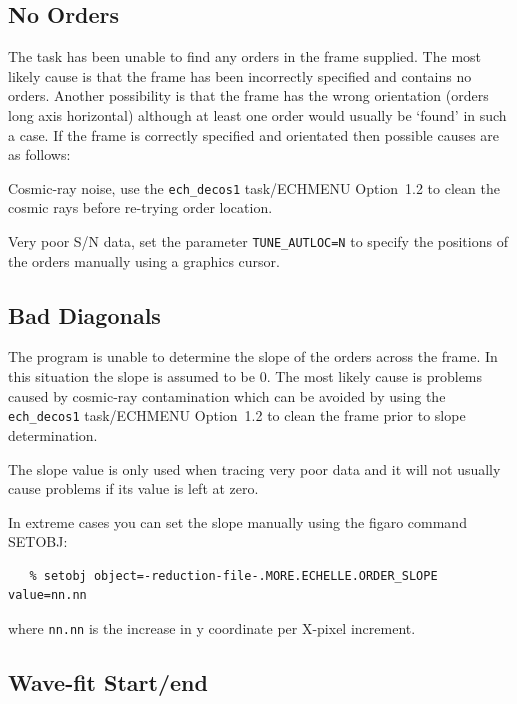 \documentclass[11pt,twoside]{article}
\newcommand{\htmlref}[2]{#1}
\newcommand{\xref}[3]{#1}
\newcommand{\xlabel}[1]{}
\newcommand{\mlabel}[1]{\xlabel{#1}\label{#1}}
\newcommand{\myindex}[1]{\index{#1}}
\renewcommand{\myindex}[1]{}
\begin{document}
\subsection{\mlabel{no_orders} No Orders}
\myindex{Locating orders!failure}

The task has been unable to find any orders in the frame supplied. The
most likely cause is that the frame has been incorrectly specified and
contains no orders. Another possibility is that the frame has the wrong
orientation (orders long axis horizontal) although at least one order
would usually be `found' in such a case. If the frame is correctly
specified and orientated then possible causes are as follows:

Cosmic-ray noise, use the \htmlref{{\tt ech\_decos1} task/ECHMENU Option~1.2}
{ech_decos1} to
clean the cosmic rays before re-trying order location.

Very poor S/N data, set the parameter
\htmlref{{\tt{TUNE\_AUTLOC=N}}}{par_TUNE_AUTLOC} to specify the
positions of the orders manually using a graphics cursor.

\subsection{\mlabel{bad_diagonals} Bad Diagonals}

The program is unable to determine the slope of the orders across the
frame. In this situation the slope is assumed to be 0. The most likely
cause is problems caused by cosmic-ray contamination which can be
avoided by using the \texttt{ech\_decos1} task/ECHMENU Option~1.2 to clean the
frame prior to slope determination.

The slope value is only used when tracing very poor data and it will not
usually cause problems if its value is left at zero.

In extreme cases you can set the slope manually using the
\xref{{\sc figaro}}{sun86}{} command \xref{SETOBJ}{sun86}{SETOBJ}:

\begin{verbatim}
   % setobj object=-reduction-file-.MORE.ECHELLE.ORDER_SLOPE value=nn.nn
\end{verbatim}

where {\tt nn.nn} is the increase in y coordinate per X-pixel increment.

\subsection{\mlabel{wave_fit_start_end} Wave-fit Start/end}
\end{document}
